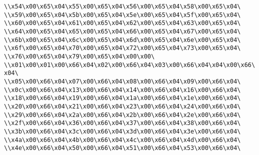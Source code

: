\verb|\\x54\x00\x65\x04\x55\x00\x65\x04\x56\x00\x65\x04\x58\x00\x65\x04\|\newline
\verb|\\x59\x00\x65\x04\x5b\x00\x65\x04\x5e\x00\x65\x04\x5f\x00\x65\x04\|\newline
\verb|\\x60\x00\x65\x04\x61\x00\x65\x04\x62\x00\x65\x04\x63\x00\x65\x04\|\newline
\verb|\\x64\x00\x65\x04\x65\x00\x65\x04\x66\x00\x65\x04\x67\x00\x65\x04\|\newline
\verb|\\x6b\x00\x65\x04\x6c\x00\x65\x04\x6d\x00\x65\x04\x6e\x00\x65\x04\|\newline
\verb|\\x6f\x00\x65\x04\x70\x00\x65\x04\x72\x00\x65\x04\x73\x00\x65\x04\|\newline
\verb|\\x76\x00\x65\x04\x79\x00\x65\x04\x00\x00\|\newline
\verb|\\x01\x00\x01\x00\x66\x04\x02\x00\x66\x04\x03\x00\x66\x04\x04\x00\x66\x04\|\newline
\verb|\\x05\x00\x66\x04\x07\x00\x66\x04\x08\x00\x66\x04\x09\x00\x66\x04\|\newline
\verb|\\x0c\x00\x66\x04\x13\x00\x66\x04\x14\x00\x66\x04\x16\x00\x66\x04\|\newline
\verb|\\x18\x00\x66\x04\x19\x00\x66\x04\x1a\x00\x66\x04\x1e\x00\x66\x04\|\newline
\verb|\\x20\x00\x66\x04\x21\x00\x66\x04\x23\x00\x66\x04\x24\x00\x66\x04\|\newline
\verb|\\x29\x00\x66\x04\x2a\x00\x66\x04\x2b\x00\x66\x04\x2e\x00\x66\x04\|\newline
\verb|\\x2f\x00\x66\x04\x36\x00\x66\x04\x37\x00\x66\x04\x38\x00\x66\x04\|\newline
\verb|\\x3b\x00\x66\x04\x3c\x00\x66\x04\x3d\x00\x66\x04\x3e\x00\x66\x04\|\newline
\verb|\\x4a\x00\x66\x04\x4b\x00\x66\x04\x4c\x00\x66\x04\x4d\x00\x66\x04\|\newline
\verb|\\x4e\x00\x66\x04\x50\x00\x66\x04\x51\x00\x66\x04\x53\x00\x66\x04\|\newline
